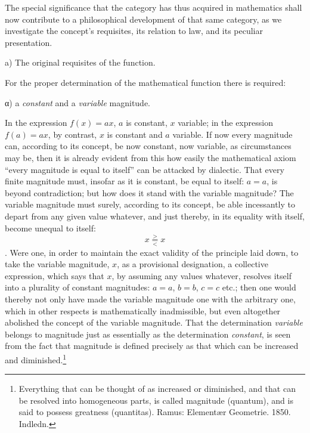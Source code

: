\documentclass[12pt,a4paper,openany]{book}
\newcommand{\opage}[1]{\marginnote{\footnotesize\textit{[#1]}}}
\begin{document}
The special significance that the category has thus acquired
in mathematics shall now contribute to a philosophical
development of that same category, as we investigate the concept's
requisites, its relation to law, and its peculiar
presentation.
\setcounter{footnote}{0}%
\opage{5}
\begin{center}a) The original requisites of the function.\end{center}

For the proper determination of the mathematical
function there is required:

\begin{center}α) a \emph{constant} and a \emph{variable} magnitude.\end{center}

In the expression $f(x)=ax$, $a$ is constant, $x$ variable; in
the expression $f(a)=ax$, by contrast, $x$ is constant and $a$ variable. If
now every magnitude can, according to its concept, be now constant,
now variable, as circumstances may be, then it is already evident from this
how easily the mathematical axiom ``every magnitude is equal to itself''
can be attacked by dialectic. That every finite magnitude
must, insofar as it is constant, be equal to itself: $a=a$, is beyond contradiction; but how does it stand with
the variable magnitude? The variable magnitude must surely,
according to its concept, be able incessantly to depart from any
given value whatever, and just thereby, in its equality with itself,
become unequal to itself:
\[ x \overset{>}{\underset{<}{=}} x \]
. Were one, in order to maintain the exact validity of the
principle laid down, to take the variable
magnitude, $x$, as a provisional designation, a collective
expression, which says that $x$, by assuming any values whatever,
resolves itself into a plurality of constant magnitudes: $a=a$, $b=b$, $c=c$ etc.; then one would thereby not only have made the
variable magnitude one with the arbitrary one, which in other respects is mathematically inadmissible, but even
altogether abolished the concept of the variable magnitude. That the determination
\emph{variable} belongs to magnitude just as essentially
as the determination \emph{constant}, is seen from the fact that magnitude
is defined precisely as that which can be increased and diminished.\footnote[1]{Everything that can be thought of as increased or diminished, and that can be resolved into homogeneous parts, is called magnitude (quantum), and is said to possess greatness (quantitas). Ramus: Elementær Geometrie. 1850. Indledn.}
\end{document}
